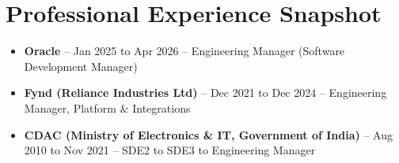 \section{Professional Experience Snapshot}
\begin{itemize}[itemsep=1pt]
\item \textbf{Oracle} – Jan 2025 to Apr 2026 – Engineering Manager (Software Development Manager)
\item \textbf{Fynd (Reliance Industries Ltd)} – Dec 2021 to Dec 2024 – Engineering Manager, Platform \& Integrations
\item \textbf{CDAC (Ministry of Electronics \& IT, Government of India)} – Aug 2010 to Nov 2021 – SDE2 to SDE3 to Engineering Manager
\end{itemize}
